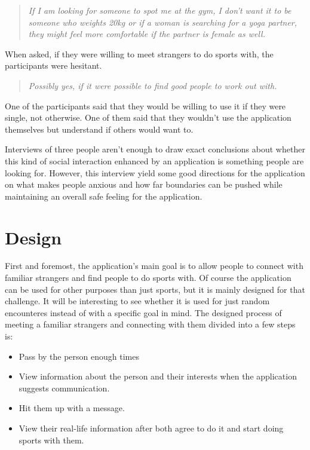 \begin{quotation}
\it If I am looking for someone to spot me at the gym, I don't want it to be someone who weights 20kg or if a woman is searching for a yoga partner, they might feel more comfortable if the partner is female as well.
\end{quotation}

When asked, if they were willing to meet strangers to do sports with, the participants were hesitant.

\begin{quotation}
\it Possibly yes, if it were possible to find good people to work out with.
\end{quotation}

One of the participants said that they would be willing to use it if they were single, not otherwise. One of them said that they wouldn't use the application themselves but understand if others would want to.

Interviews of three people aren't enough to draw exact conclusions about whether this kind of social interaction enhanced by an application is something people are looking for. However, this interview yield some good directions for the application on what makes people anxious and how far boundaries can be pushed while maintaining an overall safe feeling for the application.


\section{Design}

First and foremost, the application's main goal is to allow people to connect with familiar strangers and find people to do sports with. Of course the application can be used for other purposes than just sports, but it is mainly designed for that challenge. It will be interesting to see whether it is used for just random encounteres instead of with a specific goal in mind. The designed process of meeting a familiar strangers and connecting with them divided into a few steps is:

\begin{itemize}
	\item Pass by the person enough times
	\item View information about the person and their interests when the application suggests communication.
	\item Hit them up with a message.
	\item View their real-life information after both agree to do it and start doing sports with them.
\end{itemize}

